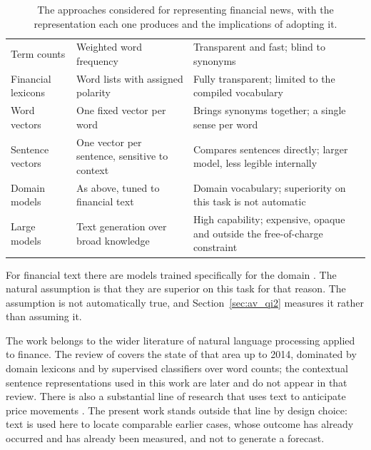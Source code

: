 \begin{table}[!htbp]
\caption[Text representation approaches]{The approaches considered for representing financial news,
with the representation each one produces and the implications of adopting it.}
\label{tab:ctx_texto}
\centering
\small
\begin{tabular}{L{0.22\textwidth} L{0.28\textwidth} L{0.36\textwidth}}
\toprule
{} &  &  \\
\midrule
Term counts \newline \autocite{salton1975vsm, robertson2009bm25}
  & Weighted word frequency
  & Transparent and fast; blind to synonyms \\
\addlinespace
Financial lexicons \newline \autocite{loughran2011liability}
  & Word lists with assigned polarity
  & Fully transparent; limited to the compiled vocabulary \\
\addlinespace
Word vectors \newline \autocite{mikolov2013word2vec, pennington2014glove}
  & One fixed vector per word
  & Brings synonyms together; a single sense per word \\
\addlinespace
Sentence vectors \newline \autocite{devlin2019bert, reimers2019sbert}
  & One vector per sentence, sensitive to context
  & Compares sentences directly; larger model, less legible internally \\
\addlinespace
Domain models \newline \autocite{liu2020finbert, huang2023finbert}
  & As above, tuned to financial text
  & Domain vocabulary; superiority on this task is not automatic \\
\addlinespace
Large models \newline \autocite{li2023llmfinance}
  & Text generation over broad knowledge
  & High capability; expensive, opaque and outside the free-of-charge constraint \\
\bottomrule
\end{tabular}
\end{table}

For financial text there are models trained specifically for the domain
\autocite{liu2020finbert, huang2023finbert}. The natural assumption is that they are superior on
this task for that reason. The assumption is not automatically true, and
Section~\ref{sec:av_qi2} measures it rather than assuming it.

The work belongs to the wider literature of natural language processing applied to finance. The
review of \textcite{kearney2014textual} covers the state of that area up to 2014, dominated by
domain lexicons and by supervised classifiers over word counts; the contextual sentence
representations used in this work are later and do not appear in that review. There is also a
substantial line of research that uses text to anticipate price movements
\autocite{xing2018nlffsurvey, ding2015deep}. The present work stands outside that line by design
choice: text is used here to locate comparable earlier cases, whose outcome has already occurred
and has already been measured, and not to generate a forecast.

